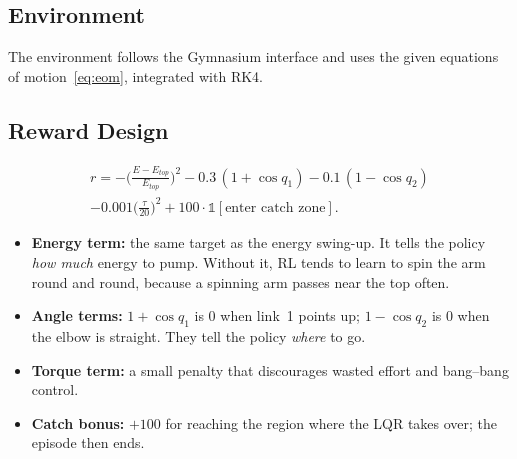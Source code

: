 \documentclass[12pt,a4paper]{article}
\begin{document}
\subsection{Environment}
The environment follows the Gymnasium interface and uses the given equations of motion~\eqref{eq:eom}, integrated with RK4.
\begin{table}[H]
\centering
\caption{RL environment}
\label{tab:env}
\end{table}

\subsection{Reward Design}
\begin{multline}
r=-\Big(\frac{E-E_{top}}{E_{top}}\Big)^2-0.3\,(1+\cos q_1)-0.1\,(1-\cos q_2)\\
-0.001\Big(\frac{\tau}{20}\Big)^2+100\cdot\mathbb 1[\text{enter catch zone}] .
\end{multline}
\begin{itemize}
\item \textbf{Energy term:} the same target as the energy swing-up. It tells the policy \emph{how much} energy to pump. Without it, RL tends to learn to spin the arm round and round, because a spinning arm passes near the top often.
\item \textbf{Angle terms:} $1+\cos q_1$ is 0 when link~1 points up; $1-\cos q_2$ is 0 when the elbow is straight. They tell the policy \emph{where} to go.
\item \textbf{Torque term:} a small penalty that discourages wasted effort and bang--bang control.
\item \textbf{Catch bonus:} $+100$ for reaching the region where the LQR takes over; the episode then ends.
\end{itemize}
\end{document}
